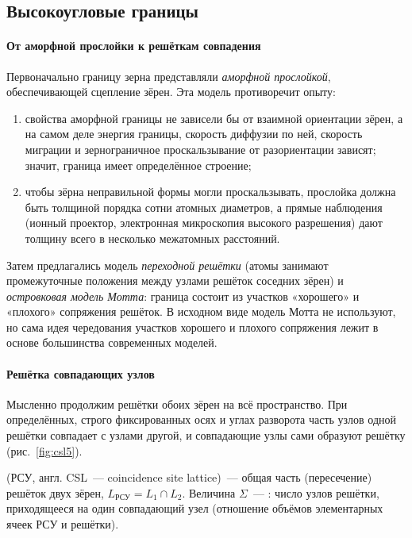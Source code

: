 \subsection{Высокоугловые границы}\label{ssec:high-angle}

\paragraph{От аморфной прослойки к решёткам совпадения}
Первоначально границу зерна представляли \emph{аморфной прослойкой},
обеспечивающей сцепление зёрен. Эта модель противоречит опыту:
\begin{enumerate}
\item свойства аморфной границы не зависели бы от взаимной ориентации
зёрен, а на самом деле энергия границы, скорость диффузии по ней,
скорость миграции и зернограничное проскальзывание от разориентации
зависят; значит, граница имеет определённое строение;
\item чтобы зёрна неправильной формы могли проскальзывать, прослойка
должна быть толщиной порядка сотни атомных диаметров, а прямые
наблюдения (ионный проектор, электронная микроскопия высокого разрешения)
дают толщину всего в несколько межатомных расстояний.
\end{enumerate}
Затем предлагались модель \emph{переходной решётки} (атомы занимают
промежуточные положения между узлами решёток соседних зёрен) и
\emph{островковая модель Мотта}: граница состоит из участков «хорошего» и
«плохого» сопряжения решёток. В исходном виде модель Мотта не используют,
но сама идея чередования участков хорошего и плохого сопряжения лежит в
основе большинства современных моделей.

\paragraph{Решётка совпадающих узлов}
Мысленно продолжим решётки обоих зёрен на всё пространство. При
определённых, строго фиксированных осях и углах разворота часть узлов
одной решётки совпадает с узлами другой, и совпадающие узлы сами образуют
решётку (рис.~\ref{fig:csl5}).

\begin{opredelenie}
 (РСУ, англ. CSL~— coincidence site lattice)~—
общая часть (пересечение) решёток двух зёрен, $L_\text{РСУ}=L_1\cap L_2$.
Величина $\Sigma$~— : число узлов
решётки, приходящееся на один совпадающий узел (отношение объёмов
элементарных ячеек РСУ и решётки).
\end{opredelenie}

